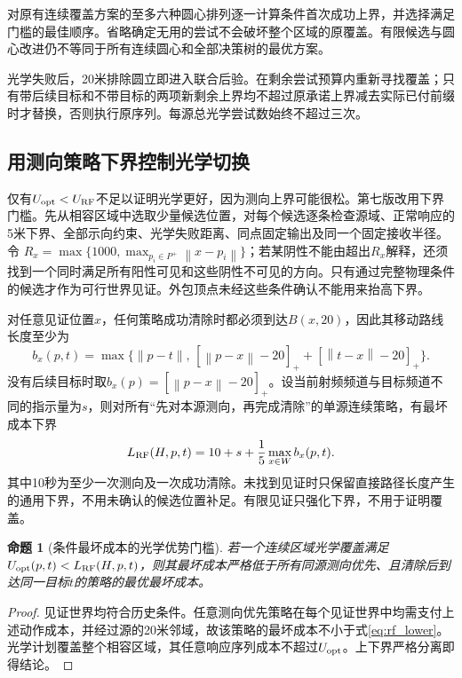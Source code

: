 \documentclass[UTF8,a4paper,zihao=-4,fontset=windows]{ctexart}
\newtheorem{proposition}[theorem]{命题}
\newcommand{\norm}[1]{\left\lVert#1\right\rVert}
\begin{document}
对原有连续覆盖方案的至多六种圆心排列逐一计算条件首次成功上界，并选择满足门槛的最佳顺序。省略确定无用的尝试不会破坏整个区域的原覆盖。有限候选与圆心改进仍不等同于所有连续圆心和全部决策树的最优方案。

光学失败后，20米排除圆立即进入联合后验。在剩余尝试预算内重新寻找覆盖；只有带后续目标和不带目标的两项新剩余上界均不超过原承诺上界减去实际已付前缀时才替换，否则执行原序列。每源总光学尝试数始终不超过三次。

\subsection{用测向策略下界控制光学切换}
仅有$U_{\rm opt}<U_{\rm RF}$不足以证明光学更好，因为测向上界可能很松。第七版改用下界门槛。先从相容区域中选取少量候选位置，对每个候选逐条检查源域、正常响应的5米下界、全部示向约束、光学失败距离、同点固定输出及同一个固定接收半径。令
$R_x=\max\{1000,\max_{p_i\in P^+}\norm{x-p_i}\}$；若某阴性不能由超出$R_x$解释，还须找到一个同时满足所有阳性可见和这些阴性不可见的方向。只有通过完整物理条件的候选才作为可行世界见证。外包顶点未经这些条件确认不能用来抬高下界。

对任意见证位置$x$，任何策略成功清除时都必须到达$B(x,20)$，因此其移动路线长度至少为
\begin{equation}
b_x(p,t)=\max\{\norm{p-t},\,
[\norm{p-x}-20]_+ +[\norm{t-x}-20]_+\}.
\end{equation}
没有后续目标时取$b_x(p)=[\norm{p-x}-20]_+$。设当前射频频道与目标频道不同的指示量为$s$，则对所有“先对本源测向，再完成清除”的单源连续策略，有最坏成本下界
\begin{equation}\label{eq:rf_lower}
L_{\rm RF}(H,p,t)=10+s+\frac15\max_{x\in W}b_x(p,t).
\end{equation}
其中10秒为至少一次测向及一次成功清除。未找到见证时只保留直接路径长度产生的通用下界，不用未确认的候选位置补足。有限见证只强化下界，不用于证明覆盖。

\begin{proposition}[条件最坏成本的光学优势门槛]
若一个连续区域光学覆盖满足$U_{\rm opt}(p,t)<L_{\rm RF}(H,p,t)$，则其最坏成本严格低于所有同源测向优先、且清除后到达同一目标$t$的策略的最优最坏成本。
\end{proposition}
\begin{proof}
见证世界均符合历史条件。任意测向优先策略在每个见证世界中均需支付上述动作成本，并经过源的20米邻域，故该策略的最坏成本不小于式\eqref{eq:rf_lower}。光学计划覆盖整个相容区域，其任意响应序列成本不超过$U_{\rm opt}$。上下界严格分离即得结论。
\end{proof}
\end{document}
